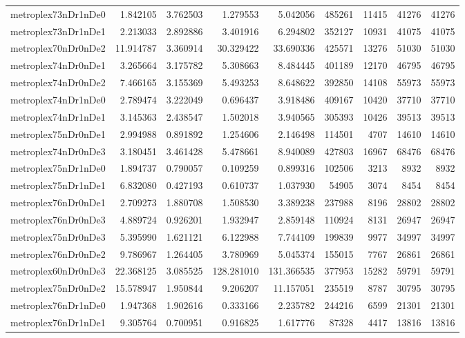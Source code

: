 \begin{longtable}{|l|r|r|r|r|r|r|r|r|}
metroplex73nDr1nDe0 & 1.842105 & 3.762503 & 1.279553 & 5.042056 & 485261 & 11415 & 41276 & 41276 \\
metroplex73nDr1nDe1 & 2.213033 & 2.892886 & 3.401916 & 6.294802 & 352127 & 10931 & 41075 & 41075 \\
metroplex70nDr0nDe2 & 11.914787 & 3.360914 & 30.329422 & 33.690336 & 425571 & 13276 & 51030 & 51030 \\
metroplex74nDr0nDe1 & 3.265664 & 3.175782 & 5.308663 & 8.484445 & 401189 & 12170 & 46795 & 46795 \\
metroplex74nDr0nDe2 & 7.466165 & 3.155369 & 5.493253 & 8.648622 & 392850 & 14108 & 55973 & 55973 \\
metroplex74nDr1nDe0 & 2.789474 & 3.222049 & 0.696437 & 3.918486 & 409167 & 10420 & 37710 & 37710 \\
metroplex74nDr1nDe1 & 3.145363 & 2.438547 & 1.502018 & 3.940565 & 305393 & 10426 & 39513 & 39513 \\
metroplex75nDr0nDe1 & 2.994988 & 0.891892 & 1.254606 & 2.146498 & 114501 & 4707 & 14610 & 14610 \\
metroplex74nDr0nDe3 & 3.180451 & 3.461428 & 5.478661 & 8.940089 & 427803 & 16967 & 68476 & 68476 \\
metroplex75nDr1nDe0 & 1.894737 & 0.790057 & 0.109259 & 0.899316 & 102506 & 3213 & 8932 & 8932 \\
metroplex75nDr1nDe1 & 6.832080 & 0.427193 & 0.610737 & 1.037930 & 54905 & 3074 & 8454 & 8454 \\
metroplex76nDr0nDe1 & 2.709273 & 1.880708 & 1.508530 & 3.389238 & 237988 & 8196 & 28802 & 28802 \\
metroplex76nDr0nDe3 & 4.889724 & 0.926201 & 1.932947 & 2.859148 & 110924 & 8131 & 26947 & 26947 \\
metroplex75nDr0nDe3 & 5.395990 & 1.621121 & 6.122988 & 7.744109 & 199839 & 9977 & 34997 & 34997 \\
metroplex76nDr0nDe2 & 9.786967 & 1.264405 & 3.780969 & 5.045374 & 155015 & 7767 & 26861 & 26861 \\
metroplex60nDr0nDe3 & 22.368125 & 3.085525 & 128.281010 & 131.366535 & 377953 & 15282 & 59791 & 59791 \\
metroplex75nDr0nDe2 & 15.578947 & 1.950844 & 9.206207 & 11.157051 & 235519 & 8787 & 30795 & 30795 \\
metroplex76nDr1nDe0 & 1.947368 & 1.902616 & 0.333166 & 2.235782 & 244216 & 6599 & 21301 & 21301 \\
metroplex76nDr1nDe1 & 9.305764 & 0.700951 & 0.916825 & 1.617776 & 87328 & 4417 & 13816 & 13816 \\

\end{longtable}
